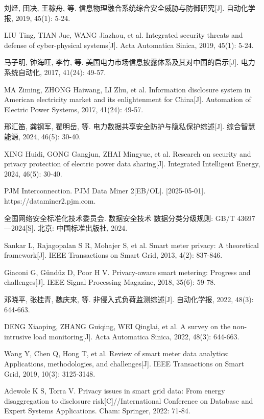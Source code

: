刘烃, 田决, 王稼舟, 等. 信息物理融合系统综合安全威胁与防御研究[J]. 自动化学报, 2019, 45(1): 5-24.

LIU Ting, TIAN Jue, WANG Jiazhou, et al. Integrated security threats and defense of cyber-physical systems[J]. Acta Automatica Sinica, 2019, 45(1): 5-24.

马子明, 钟海旺, 李竹, 等. 美国电力市场信息披露体系及其对中国的启示[J]. 电力系统自动化, 2017, 41(24): 49-57.

MA Ziming, ZHONG Haiwang, LI Zhu, et al. Information disclosure system in American electricity market and its enlightenment for China[J]. Automation of Electric Power Systems, 2017, 41(24): 49-57.

邢汇笛, 龚钢军, 翟明岳, 等. 电力数据共享安全防护与隐私保护综述[J]. 综合智慧能源, 2024, 46(5): 30-40.

XING Huidi, GONG Gangjun, ZHAI Mingyue, et al. Research on security and privacy protection of electric power data sharing[J]. Integrated Intelligent Energy, 2024, 46(5): 30-40.

PJM Interconnection. PJM Data Miner 2[EB/OL]. [2025-05-01]. https://dataminer2.pjm.com.

全国网络安全标准化技术委员会. 数据安全技术 数据分类分级规则: GB/T 43697—2024[S]. 北京: 中国标准出版社, 2024.

Sankar L, Rajagopalan S R, Mohajer S, et al. Smart meter privacy: A theoretical framework[J]. IEEE Transactions on Smart Grid, 2013, 4(2): 837-846.

Giaconi G, Gündüz D, Poor H V. Privacy-aware smart metering: Progress and challenges[J]. IEEE Signal Processing Magazine, 2018, 35(6): 59-78.

邓晓平, 张桂青, 魏庆来, 等. 非侵入式负荷监测综述[J]. 自动化学报, 2022, 48(3): 644-663.

DENG Xiaoping, ZHANG Guiqing, WEI Qinglai, et al. A survey on the non-intrusive load monitoring[J]. Acta Automatica Sinica, 2022, 48(3): 644-663.

Wang Y, Chen Q, Hong T, et al. Review of smart meter data analytics: Applications, methodologies, and challenges[J]. IEEE Transactions on Smart Grid, 2019, 10(3): 3125-3148.

Adewole K S, Torra V. Privacy issues in smart grid data: From energy disaggregation to disclosure risk[C]//International Conference on Database and Expert Systems Applications. Cham: Springer, 2022: 71-84.


